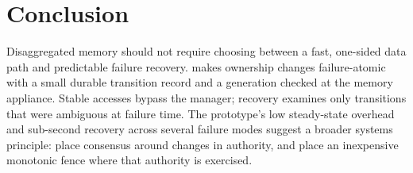 \section{Conclusion}
\label{sec:conclusion}

Disaggregated memory should not require choosing between a fast, one-sided data
path and predictable failure recovery. \system makes ownership changes
failure-atomic with a small durable transition record and a generation checked
at the memory appliance. Stable accesses bypass the manager; recovery examines
only transitions that were ambiguous at failure time. The prototype's low
steady-state overhead and sub-second recovery across several failure modes
suggest a broader systems principle: place consensus around changes in
authority, and place an inexpensive monotonic fence where that authority is
exercised.

\balance


